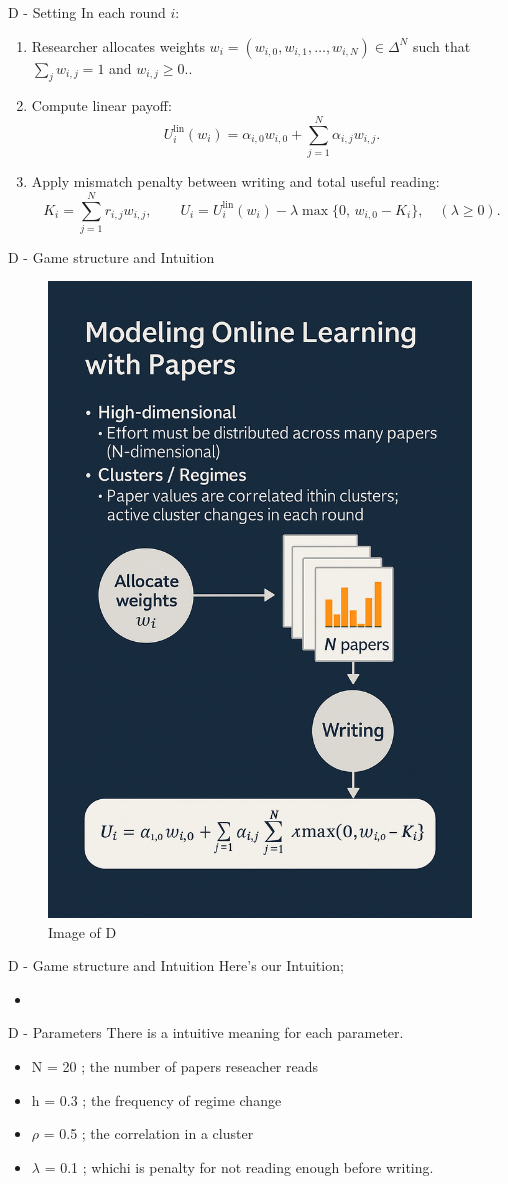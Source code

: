 \documentclass{beamer}
\begin{document}
\begin{frame}{D - Setting}
In each round $i$:
\begin{enumerate}
    \item Researcher allocates weights 
          $w_i = (w_{i,0}, w_{i,1}, \dots, w_{i,N}) \in \Delta^N$
          such that $\sum_j w_{i,j} = 1$ and $w_{i,j} \ge 0$..
    \item Compute linear payoff:
          \[
              U_i^{\mathrm{lin}}(w_i)
              = \alpha_{i,0} w_{i,0}
              + \sum_{j=1}^{N} \alpha_{i,j} w_{i,j}.
          \]
    \item Apply mismatch penalty between writing and total useful reading:
          \[
              K_i = \sum_{j=1}^{N} r_{i,j} w_{i,j}, \qquad
              U_i = U_i^{\mathrm{lin}}(w_i)
                    - \lambda \max\{0,\, w_{i,0} - K_i\},
              \quad (\lambda \ge 0).
          \]
\end{enumerate}
\end{frame}

\begin{frame}{D - Game structure and Intuition}

\begin{figure}
    \centering
    \includegraphics[width=0.35\linewidth]{332Project2/figures/Image_D.png}
    \caption{Image of D}
    \label{fig:placeholder}
\end{figure} 
\end{frame}

\begin{frame}{D - Game structure and Intuition}
Here's our Intuition;
\begin{itemize}
    \item 
\end{itemize}
\end{frame}

\begin{frame}{D - Parameters}
There is a intuitive meaning for each parameter.
\begin{itemize}
    \item N = 20 ; the number of papers reseacher reads
    \item h = 0.3 ; the frequency of regime change
    \item $\rho$ = 0.5 ; the correlation in a cluster
    \item $\lambda$ = 0.1 ; whichi is penalty for not reading enough before writing. 
\end{itemize}
\end{frame}
\end{document}

